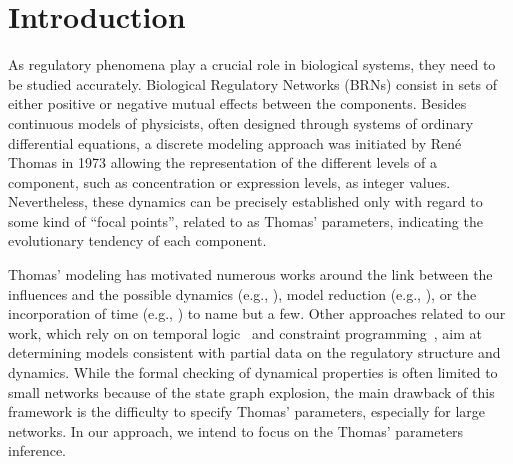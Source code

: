 \section{Introduction}
As regulatory phenomena play a crucial role in biological systems, they need to be studied accurately.
Biological Regulatory Networks (BRNs) consist in sets of either positive or negative mutual effects between the components.
Besides continuous models of physicists, often designed through systems of ordinary
differential equations, a discrete modeling approach was initiated by René Thomas in 1973
\cite{Thomas73} allowing the representation of the different levels of a component, such as concentration or expression levels, as integer values.
Nevertheless, these dynamics can be precisely established only with regard to some kind of ``focal points'', related to as Thomas' parameters, indicating the evolutionary tendency of each component.

Thomas' modeling has motivated numerous works around the link between the influences
and the possible dynamics (e.g., \cite{RiCo07}), %
model reduction (e.g., \cite{Naldi09}), %
or the incorporation of time (e.g., \cite{Siebert06,Ahmad08}) %
to name but a few.
Other approaches related to our work, which rely on on temporal logic~\cite{Khalis09} and constraint programming~\cite{20646302,DBLP:conf/ipcat/CorblinFTCT12},
aim at determining models consistent with partial data on the regulatory structure and dynamics.
While the formal checking of dynamical properties is often limited to small networks because of the
state graph explosion, the main drawback of this framework is the difficulty to specify Thomas'
parameters, especially for large networks.
In our approach, we intend to focus on the Thomas' parameters inference.

